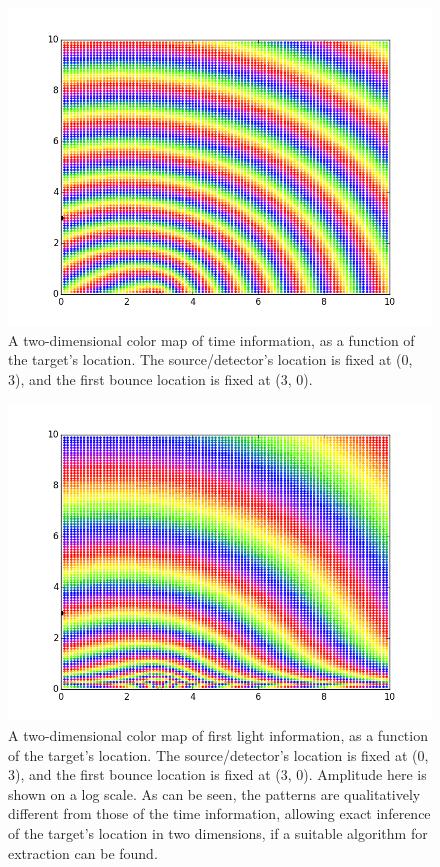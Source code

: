 \documentclass[11pt]{article}
\begin{document}
\begin{figure} 
\begin{center} 
\includegraphics[scale=0.4]{figs/light_diagram_first_time_prism.png} 
\caption{A two-dimensional color map of time information, as a function of the target's location. The source/detector's location is fixed at (0, 3), and the first bounce location is fixed at (3, 0).} 
\end{center} 
\end{figure}

\begin{figure} 
\begin{center} 
\includegraphics[scale=0.4]{figs/light_diagram_first_prism.png} 
\caption{A two-dimensional color map of first light information, as a function of the target's location. The source/detector's location is fixed at (0, 3), and the first bounce location is fixed at (3, 0). Amplitude here is shown on a log scale. As can be seen, the patterns are qualitatively different from those of the time information, allowing exact inference of the target's location in two dimensions, if a suitable algorithm for extraction can be found.} 
\end{center} 
\end{figure}
\end{document}
